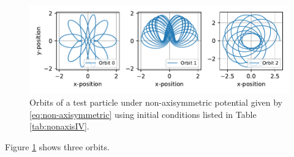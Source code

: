 \begin{figure}[htb!]
    \centering
    \includegraphics{CodeAndFigures/NonAxisSymetricOrbits.pdf}
    \caption{Orbits of a test particle under non-axisymmetric potential given by \ref{eq:non-axisymmetric} using initial conditions listed in Table \ref{tab:nonaxisIV}.}
    \label{fig:nonaxisOrbits}
\end{figure}

Figure \ref{fig:nonaxisOrbits} shows three orbits.

\subsection{}




\clearpage
